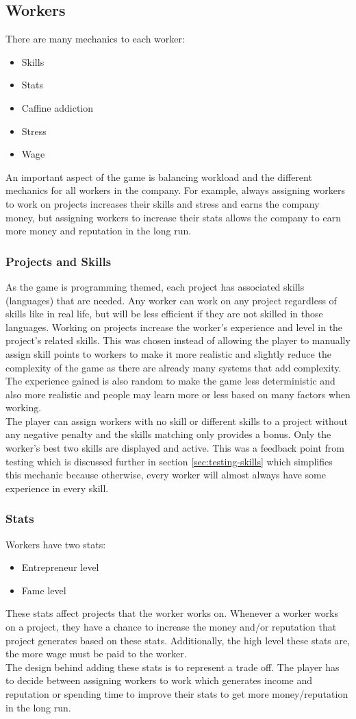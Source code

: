 \documentclass[11pt]{article}
\newcommand{\n}[0]{\\[\baselineskip]}
\begin{document}
\subsection{Workers}
There are many mechanics to each worker:
\begin{itemize}
\item Skills
\item Stats
\item Caffine addiction
\item Stress
\item Wage
\end{itemize}
An important aspect of the game is balancing workload and the different mechanics for all workers in the company. For example, always assigning workers to work on projects increases their skills and stress and earns the company money, but assigning workers to increase their stats allows the company to earn more money and reputation in the long run. 
\subsubsection{Projects and Skills}
As the game is programming themed, each project has associated skills (languages) that are needed. Any worker can work on any project regardless of skills like in real life, but will be less efficient if they are not skilled in those languages. Working on projects increase the worker's experience and level in the project's related skills. This was chosen instead of allowing the player to manually assign skill points to workers to make it more realistic and slightly reduce the complexity of the game as there are already many systems that add complexity. The experience gained is also random to make the game less deterministic and also more realistic and people may learn more or less based on many factors when working.
\n
The player can assign workers with no skill or different skills to a project without any negative penalty and the skills matching only provides a bonus. Only the worker's best two skills are displayed and active. This was a feedback point from testing which is discussed further in section \ref{sec:testing-skills} which simplifies this mechanic because otherwise, every worker will almost always have some experience in every skill. 

\subsubsection{Stats}
Workers have two stats:
\begin{itemize}
\item Entrepreneur level
\item Fame level
\end{itemize}
These stats affect projects that the worker works on. Whenever a worker works on a project, they have a chance to increase the money and/or reputation that project generates based on these stats. Additionally, the high level these stats are, the more wage must be paid to the worker. 
\n
The design behind adding these stats is to represent a trade off. The player has to decide between assigning workers to work which generates income and reputation or spending time to improve their stats to get more money/reputation in the long run. 
\end{document}

